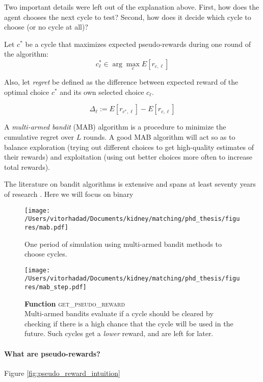 \documentclass[format=acmsmall, review=false]{acmart}
\begin{document}
Two important details were left out of the explanation above. First, how does the agent chooses the next cycle to test? Second, how does it decide which cycle to choose (or no cycle at all)? 

Let $c^{*}$ be a cycle that maximizes expected pseudo-rewards during one round of the algorithm:
$$c_{\ell}^{*} \in \arg\max_{c} E[r_{c,\ell}] $$


 Also, let \emph{regret} be defined as the difference between expected reward of the optimal choice $c^*$ and its own selected choice $c_{\ell}$.
 
 $$\Delta_\ell := E[r_{c^{*},\ell}] - E[r_{c,\ell}]$$
 
 A \emph{multi-armed bandit} (MAB) algorithm is a procedure to minimize the cumulative regret over $L$ rounds. A good MAB algorithm will act so as to balance exploration (trying out different choices to get high-quality estimates of their rewards) and exploitation (using out better choices more often to increase total rewards). 
 
 The literature on bandit algorithms is extensive and spans at least seventy years of research \citep{lattimore2018bandits}. Here we will focus on binary 
 
 
 

 \begin{figure}
  \centering
  \texttt{[image: /Users/vitorhadad/Documents/kidney/matching/phd\_thesis/figures/mab.pdf]}
  \caption{One period of simulation using multi-armed bandit methods to choose cycles.}
  \label{fig:mab}
  \end{figure}

  \begin{figure}
  \centering
  \texttt{[image: /Users/vitorhadad/Documents/kidney/matching/phd\_thesis/figures/mab\_step.pdf]}
  \caption{\textbf{Function} \textsc{get\_pseudo\_reward} \\ Multi-armed bandits evaluate if a cycle should be cleared by checking if there is a high chance that the cycle will be used in the future. Such cycles get a \emph{lower} reward, and are left for later.}
  \label{fig:get_pseudo_reward}
  \end{figure}




  
\paragraph{What are pseudo-rewards?} Figure \ref{fig:pseudo_reward_intuition}
\end{document}
